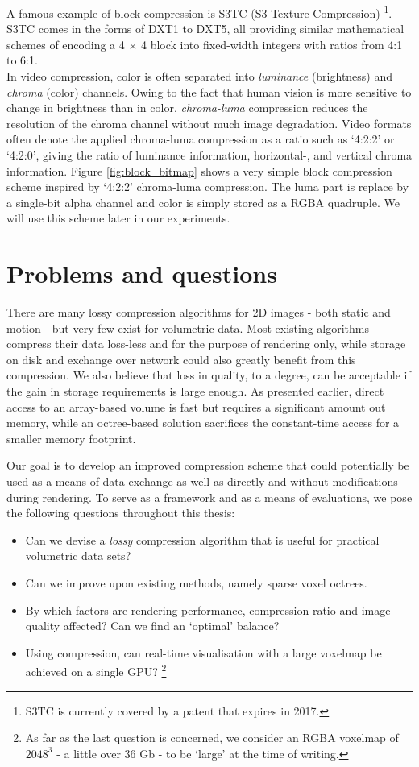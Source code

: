 A famous example of block compression is S3TC (S3 Texture Compression) \cite{s3tc}\footnote{S3TC is currently covered by a patent that expires in 2017.}. S3TC comes in the forms of DXT1 to DXT5, all providing similar mathematical schemes of encoding a 4 $\times$ 4 block into fixed-width integers with ratios from 4:1 to 6:1. \\
In video compression, color is often separated into \emph{luminance} (brightness) and \emph{chroma} (color) channels. Owing to the fact that human vision is more sensitive to change in brightness than in color, \emph{chroma-luma} compression reduces the resolution of the chroma channel without much image degradation. Video formats often denote the applied chroma-luma compression as a ratio such as `4:2:2' or `4:2:0', giving the ratio of luminance information, horizontal-, and vertical chroma information. Figure \ref{fig:block_bitmap} shows a very simple block compression scheme inspired by `4:2:2' chroma-luma compression. The luma part is replace by a single-bit alpha channel and color is simply stored as a RGBA quadruple. We will use this scheme later in our experiments.
%
\section{Problems and questions}
%
There are many lossy compression algorithms for 2D images - both static and motion - but very few exist for volumetric data. Most existing algorithms compress their data loss-less and for the purpose of rendering only, while storage on disk and exchange over network could also greatly benefit from this compression. We also believe that loss in quality, to a degree, can be acceptable if the gain in storage requirements is large enough. As presented earlier, direct access to an array-based volume is fast but requires a significant amount out memory, while an octree-based solution sacrifices the constant-time access for a smaller memory footprint.

Our goal is to develop an improved compression scheme that could potentially be used as a means of data exchange as well as directly and without modifications during rendering. To serve as a framework and as a means of evaluations, we pose the following questions throughout this thesis:
\begin{itemize}
\item Can we devise a \emph{lossy} compression algorithm that is useful for practical volumetric data sets?
\item Can we improve upon existing methods, namely sparse voxel octrees.
\item By which factors are rendering performance, compression ratio and image quality affected? Can we find an `optimal' balance?
\item Using compression, can real-time visualisation with a large voxelmap be achieved on a single GPU? \footnote{As far as the last question is concerned, we consider an RGBA voxelmap of $2048^3$ - a little over 36 Gb - to be `large' at the time of writing. }
\end{itemize}

